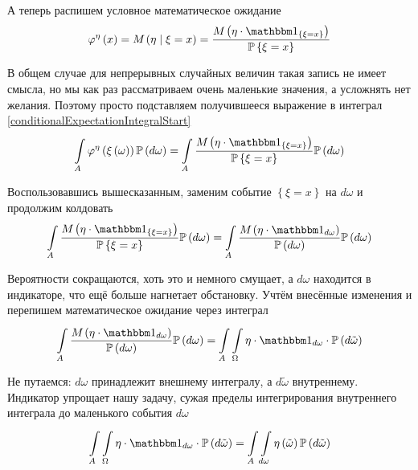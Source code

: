 А теперь распишем условное математическое ожидание
$$\varphi^{\eta}\left( x \right)
    = \mean{\left( \eta \mid \xi = x \right)}
    = \frac{\mean{\left( \eta
        \cdot \indicatorof{\left\{ \xi = x \right\}} \right)}}
        {\Probability{\xi = x}}$$

В общем случае для непрерывных случайных величин такая запись не имеет смысла,
но мы как раз рассматриваем очень маленькие значения,
а усложнять нет желания.
Поэтому просто подставляем получившееся выражение
в интеграл \eqref{conditionalExpectationIntegralStart}
$$\integralc{A}{}{\probability{d\omega}}{
    \varphi^{\eta}\left( \xi\left( \omega \right) \right)}
    = \integralc{A}{}{\probability{d\omega}}{
        \frac{\mean{\left( \eta
            \cdot \indicatorof{\left\{ \xi = x \right\}} \right)}}
            {\Probability{\xi = x}}}$$

Воспользовавшись вышесказанным, заменим событие $\left\{ \xi = x \right\}$
на $d\omega$ и продолжим колдовать
$$\integralc{A}{}{\probability{d\omega}}{
        \frac{\mean{\left( \eta
            \cdot \indicatorof{\left\{ \xi = x \right\}} \right)}}
            {\Probability{\xi = x}}}
    = \integralc{A}{}{\probability{d\omega}}{
        \frac{\mean{\left( \eta \cdot \indicatorof{d\omega} \right)}}
            {\probability{d\omega}}}$$

Вероятности сокращаются, хоть это и немного смущает,
а $d\omega$ находится в индикаторе, что ещё больше нагнетает обстановку.
Учтём внесённые изменения и перепишем математическое ожидание через интеграл
$$\integralc{A}{}{\probability{d\omega}}{
    \frac{\mean{\left( \eta \cdot \indicatorof{d\omega} \right)}}
        {\probability{d\omega}}}
    = \int\limits_A \integralc{\Omega}{}{\probability{d\tilde{\omega}}}{
        \eta \cdot \indicatorof{d\omega} \cdot}$$

Не путаемся: $d\omega$ принадлежит внешнему интегралу,
а $d\tilde{\omega}$ внутреннему.
Индикатор упрощает нашу задачу,
сужая пределы интегрирования внутреннего интеграла
до маленького события $d\omega$
\begin{equation}\label{conditionalExpectationIntegraldw}
    \int\limits_A \integralc{\Omega}{}{\probability{d\tilde{\omega}}}{
        \eta \cdot \indicatorof{d\omega} \cdot}
        = \int\limits_A \integralc{d\omega}{}{\probability{d\tilde{\omega}}}{
            \eta\left( \tilde{\omega}\right)}
\end{equation}

